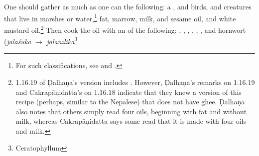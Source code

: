 \begin{translation}
    One should gather as much as one can the following: a
    , %
     and  birds, and
    creatures that live in marshes or water,\footnote{For such classifications,
    see \citet{zimm-1999} and \citet{smit-1994}.} fat, marrow, milk, and sesame oil, and
    white mustard oil.\footnote{1.16.19 of Ḍalhaṇa's version \citep[79]{vulgate} includes . However, Ḍalhaṇa's remarks on 1.16.19 and Cakrapāṇidatta's on 1.16.18 \citep[130]{acar-1939} indicate that they knew a version of this recipe  (perhaps, similar to the Nepalese) that does not have ghee. Ḍalhaṇa also notes that others simply read four oils, beginning with fat and without milk, whereas Cakrapāṇidatta says some read that it is made with four oils and milk.} %
Then cook the oil with an  of the following:
    , %
    , %
    , %
    , %
    , %
    , %
     and
    hornwort (\emph{jalaśūka} $\rightarrow$ \emph{jalanīlikā}\footnote{Ceratophyllum
}
\end{translation}
